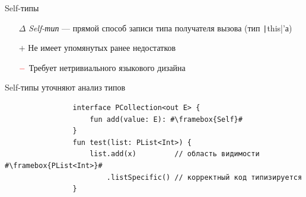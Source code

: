 \documentclass[usenames, dvipsnames]{beamer}
\begin{document}
    \begin{frame}[fragile]{Self-типы}

        \begin{itemize}
            \item[$\Delta$] \emph{Self-тип} --- прямой способ записи типа получателя вызова (тип \texttt|this|'а)
            \item[$+$] Не имеет упомянутых ранее недостатков
            \item[$\color{red} -$] Требует нетривиального языкового дизайна
        \end{itemize}

        \begin{block}{Self-типы уточняют анализ типов}
            \begin{verbatim}
                interface PCollection<out E> {
                    fun add(value: E): #\framebox{Self}#
                }
                fun test(list: PList<Int>) {
                    list.add(x)         // область видимости #\framebox{PList<Int>}#
                        .listSpecific() // корректный код типизируется
                }
            \end{verbatim}
        \end{block}
    \end{frame}
\end{document}
